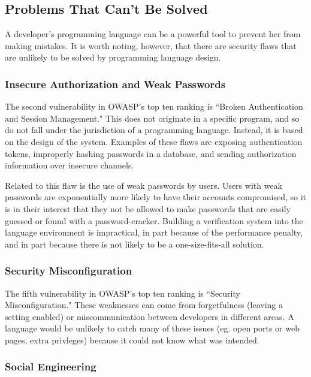 \documentclass[twocolumn]{article}
\begin{document}
\subsection{Problems That Can't Be Solved}

A developer's programming language can be a powerful tool to prevent her from making mistakes.  It is worth noting, however, that there are security flaws that are unlikely to be solved by programming language design.


\subsubsection{Insecure Authorization and Weak Passwords}

The second vulnerability in OWASP's top ten ranking is ``Broken Authentication and Session Management."\cite{owasp10}  This does not originate in a specific program, and so do not fall under the jurisdiction of a programming language.  Instead, it is based on the design of the system.  Examples of these flaws are exposing authentication tokens, improperly hashing passwords in a database, and sending authorization information over insecure channels.

Related to this flaw is the use of weak passwords by users.  Users with weak passwords are exponentially more likely to have their accounts compromised, so it is in their interest that they not be allowed to make passwords that are easily guessed or found with a password-cracker.  Building a verification system into the language environment is impractical, in part because of the performance penalty, and in part because there is not likely to be a one-size-fits-all solution.

\subsubsection{Security Misconfiguration}

The fifth vulnerability in OWASP's top ten ranking is ``Security Misconfiguration."\cite{owasp10}  These weaknesses can come from forgetfulness (leaving a setting enabled) or miscommunication between developers in different areas.  A language would be unlikely to catch many of these issues (eg. open ports or web pages, extra privleges) because it could not know what was intended.

\subsubsection{Social Engineering}
\end{document}
